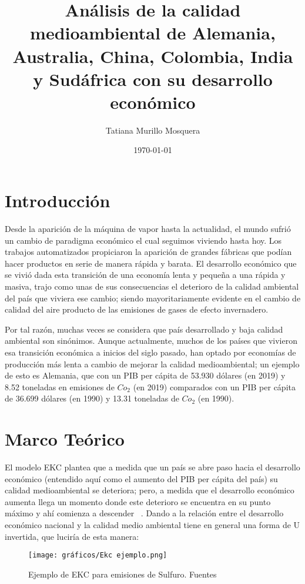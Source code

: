 \documentclass[11 pt]{article}
\title{Análisis de la calidad medioambiental de Alemania, Australia, China, Colombia, India y Sudáfrica con su desarrollo económico }
\author{Tatiana Murillo Mosquera}
\date{\today}
\begin{document}
\maketitle

\section{Introducción}
Desde la aparición de la máquina de vapor hasta la actualidad, el mundo sufrió un cambio de paradigma económico el cual seguimos viviendo hasta hoy. Los trabajos automatizados propiciaron la aparición de grandes fábricas que podían hacer productos en serie de manera rápida y barata. El desarrollo económico que se vivió dada esta transición de una economía lenta y pequeña a una rápida y masiva, trajo como unas de sus consecuencias el deterioro de la calidad ambiental del país que viviera ese cambio; siendo mayoritariamente evidente en el cambio de calidad del aire producto de las emisiones de gases de efecto invernadero.

Por tal razón, muchas veces se considera que país desarrollado y baja calidad ambiental son sinónimos. Aunque actualmente, muchos de los países que vivieron esa transición económica a inicios del siglo pasado, han optado por economías de producción más lenta a cambio de mejorar la calidad medioambiental; un ejemplo de esto es Alemania, que con un PIB per cápita de 53.930 dólares (en 2019) y 8.52 toneladas en emisiones de $Co_2$ (en 2019) comparados con un PIB per cápita de 36.699 dólares (en 1990) y 13.31 toneladas de $Co_2$ (en 1990). ~\cite{owid}


\section{Marco Teórico}

El modelo EKC plantea que a medida que un país se abre paso hacia el desarrollo económico (entendido aquí como el aumento del PIB per cápita del país) su calidad medioambiental se deteriora; pero, a medida que el desarrollo económico aumenta llega un momento donde este deterioro se encuentra en su punto máximo y ahí comienza a descender ~\cite{STERN2018}. Dando a la relación entre el desarrollo económico nacional y la calidad medio ambiental tiene en general una forma de U invertida, que luciría de esta manera:

\begin{figure}[!htb]
 \centering
  \texttt{[image: gráficos/Ekc ejemplo.png]}
 \caption{Ejemplo de EKC para emisiones de Sulfuro. Fuentes ~\cite{STERN2018} }
 \end{figure}
\end{document}
